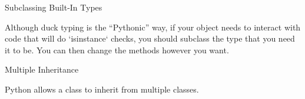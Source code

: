 \documentclass[aspectratio=149] {beamer}
\begin{document}
\begin{frame}[fragile]{Subclassing Built-In Types}
  
  
  Although duck typing is the ``Pythonic'' way, if your object needs to interact with code that will do \inline`isinstance` checks,
  you should subclass the type that you need it to be.  
  You can then change the methods however you want.
  
  
\end{frame}

\begin{frame}[fragile]{Multiple Inheritance}
  
  Python allows a class to inherit from multiple classes.
  
  
\end{frame}



\end{document}
